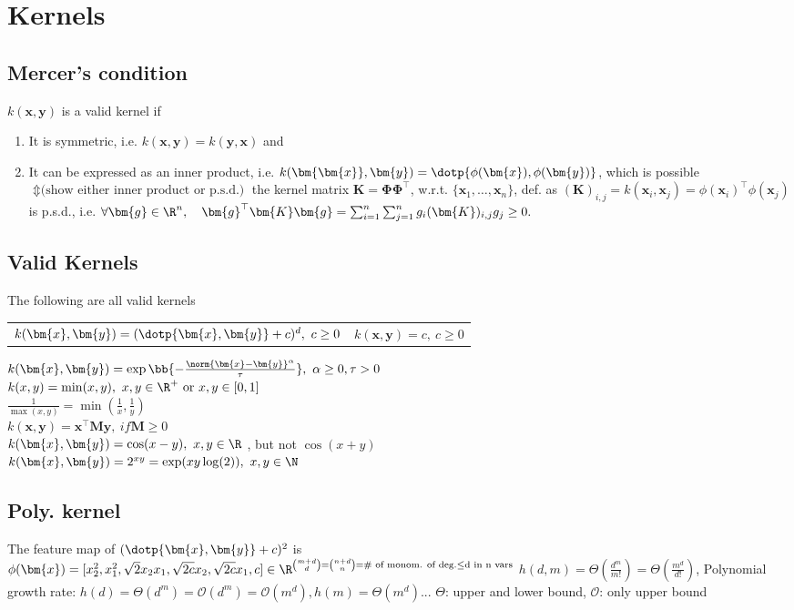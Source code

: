 \section{Kernels}
\subsection{Mercer's condition}
$k(\bm{x},\bm{y})$ is a valid kernel if
\begin{enumerate}
  \item
  It is symmetric, i.e. $k(\bm{x},\bm{y}) = k(\bm{y},\bm{x})$ and
  \item
  It can be expressed as an inner product, i.e. $k(\bm{\bm{x}},\bm{y}) = \dotp{\phi(\bm{x}), \phi(\bm{y})}$, which is possible
  $
    \Updownarrow \text{(show either inner product or p.s.d.)}
  $
  the kernel matrix $\bm{K} = \bm{\Phi\Phi}^{\top}$, w.r.t. $\{\bm{x}_{1}, \dots, \bm{x}_{n}\}$, def. as $(\bm{K})_{i,j} = k(\bm{x}_{i}, \bm{x}_{j}) = \phi(\bm{x}_{i})^{\top}\phi(\bm{x}_{j})$ is p.s.d., i.e.
  $
    \forall\bm{g} \in \R^{n}, \quad \bm{g}^{\top}\bm{K}\bm{g} = \sum_{i=1}^{n}\sum_{j=1}^{n}g_{i}(\bm{K})_{i,j}g_{j} \geq 0.
  $
\end{enumerate}

\subsection{Valid Kernels}
The following are all valid kernels
\begin{tabular}{c c}
  $k(\bm{x},\bm{y}) = (\dotp{\bm{x},\bm{y}} + c)^{d}, \ c \geq 0$  & $k(\bm{x},\bm{y}) = c, \ c \geq 0$
\end{tabular}
  $k(\bm{x},\bm{y}) = \exp\bb{-\frac{\norm{\bm{x} - \bm{y}}^{\alpha}}{\tau}},\ \alpha \geq 0, \tau > 0$ \\
  $k(x,y) = \min(x, y),\ x,y \in \R^{+} \text{ or } x,y \in [0,1]$\\
  $\frac{1}{\max{(x,y)}}=\min{(\frac{1}{x}, \frac{1}{y})}$\\
  $k(\bm{x},\bm{y}) = \bm{x}^{\top} \bm{M} \bm{y},\ if \bm{M} \geq 0$\\
  $k(\bm{x},\bm{y}) = \cos(x-y),\ x,y \in \R$ , but not $\cos(x+y)$\\
  $k(\bm{x},\bm{y}) = 2^{xy} = \exp(xy\log(2)),\ x,y \in \N$
%
\subsection{Poly. kernel}
The feature map of $(\dotp{\bm{x},\bm{y}} + c)^{2}$ is $\phi(\bm{x}) = [x_{2}^{2}, x_{1}^{2},
\sqrt{2}x_{2}x_{1}, \sqrt{2c}x_{2}, \sqrt{2c}x_{1}, c] \in \R^{\binom{m+d}{d}=\binom{n+d}{n} =
\text{\# of monom. of deg.} \leq \text{d in n vars}}$
$h(d,m)=\Theta(\frac{d^{m}}{m!})=\Theta(\frac{m^{d}}{d!})$, Polynomial growth rate:
$h(d)=\Theta(d^{m})=\mathcal{O}(d^{m})=\mathcal{O}(m^{d}), h(m)=\Theta(m^{d})...$
$\Theta$: upper and lower bound, $\mathcal{O}$: only upper bound

